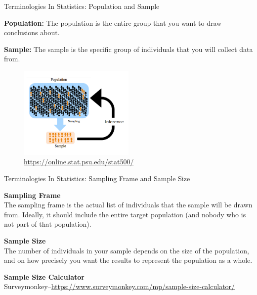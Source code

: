 \documentclass[10pt,dvipsnames, aspectratio=169]{beamer}
\begin{document}
\begin{frame}[t]{Terminologies In Statistics: Population and Sample}
	
	\textbf{Population:} The population is the entire group that you want to 
	draw conclusions about.
	
	\textbf{Sample:} The sample is the specific group of individuals that you 
	will collect data from.
	
	\begin{figure} [ht]
		\centering
		\includegraphics[width=0.5\textwidth]{stats_img/population_sample.png}
		\caption{\url{https://online.stat.psu.edu/stat500/}}
	\end{figure}
\end{frame}


\begin{frame}[t]{Terminologies In Statistics: Sampling Frame and Sample Size}
	
	\textbf{Sampling Frame} \\ 
	The sampling frame is the actual list of 
	individuals that the sample will be drawn from. Ideally, it should include 
	the entire target population (and nobody who is not part of that 
	population).
	
	\textbf{Sample Size} \\ 
	The number of individuals in your sample depends on 
	the size of the population, and on how precisely you want the results to 
	represent the population as a whole.
	
	
	\textbf{Sample Size Calculator} \\
	Surveymonkey--\url{https://www.surveymonkey.com/mp/sample-size-calculator/}
	
\end{frame}
\end{document}
